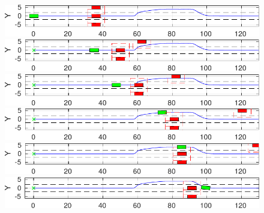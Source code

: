 \documentclass[conference,11pt]{IEEEtran}
\begin{document}
\begin{figure}[!h]
	\centering
	\begin{minipage}[t]{\columnwidth}
		\includegraphics[width=\columnwidth]{./figure/three_obstacles_no_overtaking/braking_0.pdf}
	\end{minipage}
	\begin{minipage}[t]{\columnwidth}
		\includegraphics[width=\columnwidth]{./figure/three_obstacles_no_overtaking/braking_1.pdf}
	\end{minipage}
	\begin{minipage}[t]{\columnwidth}
		\includegraphics[width=\columnwidth]{./figure/three_obstacles_no_overtaking/braking_2.pdf}
	\end{minipage}
	\begin{minipage}[t]{\columnwidth}
		\includegraphics[width=\columnwidth]{./figure/three_obstacles_no_overtaking/braking_3.pdf}
	\end{minipage}
	\begin{minipage}[t]{\columnwidth}
		\includegraphics[width=\columnwidth]{./figure/three_obstacles_no_overtaking/braking_4.pdf}
	\end{minipage}
	\begin{minipage}[t]{\columnwidth}
		\includegraphics[width=\columnwidth]{./figure/three_obstacles_no_overtaking/braking_5.pdf}

\end{minipage}
\end{figure}
\end{document}
